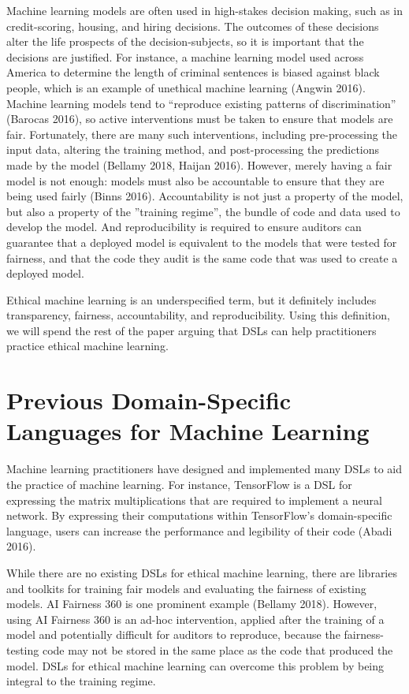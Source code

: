 \documentclass[letterpaper]{article}
\begin{document}
Machine learning models are often used in high-stakes decision making, such as in credit-scoring, housing, and hiring decisions. The outcomes of these decisions alter the life prospects of the decision-subjects, so it is important that the decisions are justified. For instance, a machine learning model used across America to determine the length of criminal sentences is biased against black people, which is an example of unethical machine learning (Angwin 2016). Machine learning models tend to ``reproduce existing patterns of discrimination” (Barocas 2016), so active interventions must be taken to ensure that models are fair. Fortunately, there are many such interventions, including pre-processing the input data, altering the training method, and post-processing the predictions made by the model (Bellamy 2018, Haijan 2016). However, merely having a fair model is not enough: models must also be accountable to ensure that they are being used fairly (Binns 2016). Accountability is not just a property of the model, but also a property of the ''training regime”, the bundle of code and data used to develop the model. And reproducibility is required to ensure auditors can guarantee that a deployed model is equivalent to the models that were tested for fairness, and that the code they audit is the same code that was used to create a deployed model. 

Ethical machine learning is an underspecified term, but it definitely includes transparency, fairness, accountability, and reproducibility. Using this definition, we will spend the rest of the paper arguing that DSLs can help practitioners practice ethical machine learning.

\section{Previous Domain-Specific Languages for Machine Learning}
Machine learning practitioners have designed and implemented many DSLs to aid the practice of machine learning. For instance, TensorFlow is a DSL for expressing the matrix multiplications that are required to implement a neural network. By expressing their computations within TensorFlow’s domain-specific language, users can increase the performance and legibility of their code (Abadi 2016). 

While there are no existing DSLs for ethical machine learning, there are libraries and toolkits for training fair models and evaluating the fairness of existing models. AI Fairness 360 is one prominent example (Bellamy 2018). However, using AI Fairness 360 is an ad-hoc intervention, applied after the training of a model and potentially difficult for auditors to reproduce, because the fairness-testing code may not be stored in the same place as the code that produced the model. DSLs for ethical machine learning can overcome this problem by being integral to the training regime.
\end{document}
